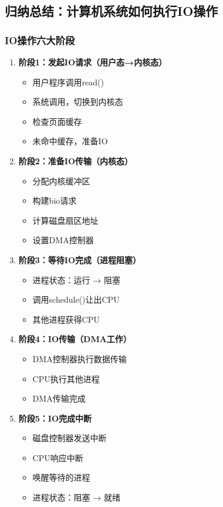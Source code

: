 \documentclass[UTF8,a4paper,12pt]{ctexart}
\begin{document}
\subsection{归纳总结：计算机系统如何执行IO操作}

\subsubsection{IO操作六大阶段}

\begin{enumerate}[leftmargin=2em]
    \item \textbf{阶段1：发起IO请求（用户态→内核态）}
    \begin{itemize}
        \item 用户程序调用read()
        \item 系统调用，切换到内核态
        \item 检查页面缓存
        \item 未命中缓存，准备IO
    \end{itemize}

    \item \textbf{阶段2：准备IO传输（内核态）}
    \begin{itemize}
        \item 分配内核缓冲区
        \item 构建bio请求
        \item 计算磁盘扇区地址
        \item 设置DMA控制器
    \end{itemize}

    \item \textbf{阶段3：等待IO完成（进程阻塞）}
    \begin{itemize}
        \item 进程状态：运行 → 阻塞
        \item 调用schedule()让出CPU
        \item 其他进程获得CPU
    \end{itemize}

    \item \textbf{阶段4：IO传输（DMA工作）}
    \begin{itemize}
        \item DMA控制器执行数据传输
        \item CPU执行其他进程
        \item DMA传输完成
    \end{itemize}

    \item \textbf{阶段5：IO完成中断}
    \begin{itemize}
        \item 磁盘控制器发送中断
        \item CPU响应中断
        \item 唤醒等待的进程
        \item 进程状态：阻塞 → 就绪
    \end{itemize}


\end{enumerate}
\end{document}
